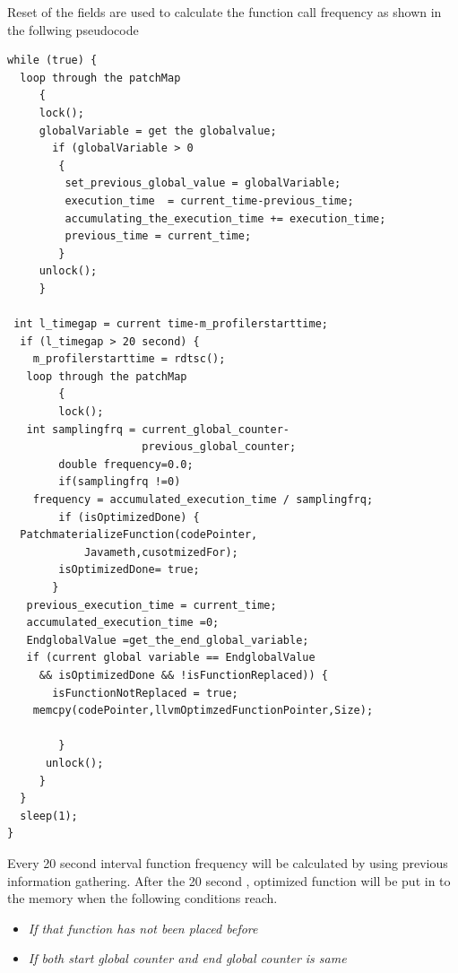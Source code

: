 Reset of the fields are used to calculate the function call frequency as shown in the follwing pseudocode
\scriptsize\begin{verbatim}
while (true) {
  loop through the patchMap
     {
     lock();
     globalVariable = get the globalvalue;
       if (globalVariable > 0
        {
         set_previous_global_value = globalVariable;
         execution_time  = current_time-previous_time;
         accumulating_the_execution_time += execution_time;
         previous_time = current_time;
        }
     unlock();
     }

 int l_timegap = current time-m_profilerstarttime;
  if (l_timegap > 20 second) {
    m_profilerstarttime = rdtsc();
   loop through the patchMap
        {
        lock();
   int samplingfrq = current_global_counter-
                     previous_global_counter;
        double frequency=0.0;
        if(samplingfrq !=0)
    frequency = accumulated_execution_time / samplingfrq;
        if (isOptimizedDone) {
  PatchmaterializeFunction(codePointer, 
            Javameth,cusotmizedFor);
        isOptimizedDone= true;
       }
   previous_execution_time = current_time;
   accumulated_execution_time =0;
   EndglobalValue =get_the_end_global_variable;
   if (current global variable == EndglobalValue 
     && isOptimizedDone && !isFunctionReplaced)) {
       isFunctionNotReplaced = true;
    memcpy(codePointer,llvmOptimzedFunctionPointer,Size);
               
        }
      unlock();
     }
  }
  sleep(1);
}

\end{verbatim}
\normalsize
Every 20 second interval function frequency will be calculated by using previous information gathering. After the 20 second , optimized function will be put in to the memory when the following conditions reach. 
 \begin{itemize}
  \item \textit{If that function has not been placed before}
  \item \textit{If both start global counter and end global counter is same}
\end{itemize}
          
